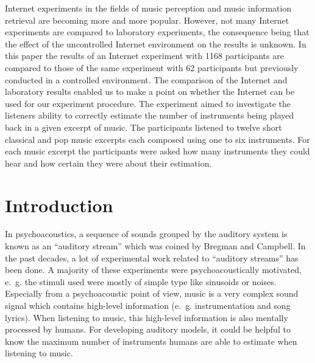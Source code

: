 %

Internet experiments in the fields of music perception and music information retrieval are becoming more and more popular. However, not many Internet experiments are compared to laboratory experiments, the consequence being that the effect of the uncontrolled Internet environment on the results is unknown.
In this paper the results of an Internet experiment with 1168 participants are compared to those of the same experiment with 62 participants but previously conducted in a controlled environment. The comparison of the Internet and laboratory results enabled us to make a point on whether the Internet can be used for our experiment procedure. The experiment aimed to investigate the listeners ability to correctly estimate the number of instruments being played back in a given excerpt of music. The participants listened to twelve short classical and pop music excerpts each composed using one to six instruments. For each music excerpt the participants were asked how many instruments they could hear and how certain they were about their estimation.
%
\section{Introduction}\label{sec:introduction}

In psychoacoustics, a sequence of sounds grouped by the auditory system is known as an ``auditory stream'' which was coined by Bregman and Campbell\cite{Bregman1971}. In the past decades, a lot of experimental work related to ``auditory streams'' has been done\cite{bregman90}. A majority of these experiments were psychoacoustically motivated, e.~g. the stimuli used were mostly of simple type like sinusoids or noises. Especially from a psychoacoustic point of view, music is a very complex sound signal which contains high-level information (e.~g. instrumentation and song lyrics). When listening to music, this high-level information is also mentally processed by humans. For developing auditory models, it could be helpful to know the maximum number of instruments humans are able to estimate when listening to music.


